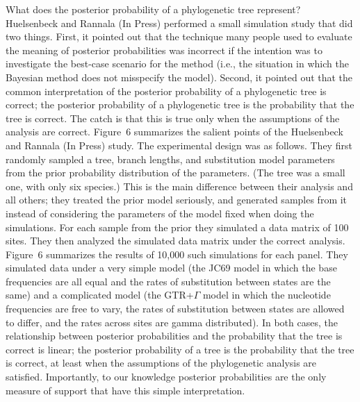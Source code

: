 \documentclass{svmult}
\begin{document}
What does the posterior probability of a phylogenetic tree represent? Huelsenbeck and Rannala (In
Press) performed a small simulation study that did two things. First, it pointed out that the
technique many people used to evaluate the meaning of posterior probabilities was incorrect if the
intention was to investigate the best-case scenario for the method (i.e., the situation in which
the Bayesian method does not misspecify the model). Second, it pointed out that the common
interpretation of the posterior probability of a phylogenetic tree is correct; the posterior
probability of a phylogenetic tree is the probability that the tree is correct. The catch is that
this is true only when the assumptions of the analysis are correct. Figure~6 summarizes the salient
points of the Huelsenbeck and Rannala (In Press) study. The experimental design was as follows.
They first randomly sampled a tree, branch lengths, and substitution model parameters from the
prior probability distribution of the parameters. (The tree was a small one, with only six
species.) This is the main difference between their analysis and all others; they treated the prior
model seriously, and generated samples from it instead of considering the parameters of the model
fixed when doing the simulations. For each sample from the prior they simulated a data matrix of
100 sites. They then analyzed the simulated data matrix under the correct analysis. Figure~6
summarizes the results of 10,000 such simulations for each panel. They simulated data under a very
simple model (the JC69 model in which the base frequencies are all equal and the rates of
substitution between states are the same) and a complicated model (the GTR+$\Gamma$ model in which
the nucleotide frequencies are free to vary, the rates of substitution between states are allowed
to differ, and the rates across sites are gamma distributed). In both cases, the relationship
between posterior probabilities and the probability that the tree is correct is linear; the
posterior probability of a tree is the probability that the tree is correct, at least when the
assumptions of the phylogenetic analysis are satisfied. Importantly, to our knowledge posterior
probabilities are the only measure of support that have this simple interpretation.
\end{document}
